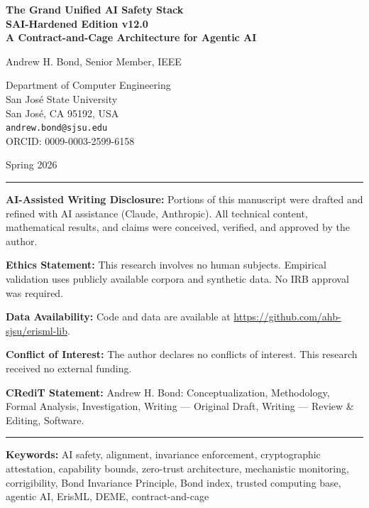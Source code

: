 \documentclass[11pt,letterpaper]{article}
\theoremstyle{definition}
\theoremstyle{remark}
\begin{document}
\begin{titlepage}
\centering
\vspace*{2cm}

{\LARGE\bfseries The Grand Unified AI Safety Stack\\
\Large SAI-Hardened Edition v12.0\\[0.5em]
\large A Contract-and-Cage Architecture for Agentic AI}

\vspace{1.5cm}

{\Large Andrew H. Bond, Senior Member, IEEE}

\vspace{0.5cm}

{\large
Department of Computer Engineering\\
San Jos\'e State University\\
San Jos\'e, CA 95192, USA\\[0.3cm]
\texttt{andrew.bond@sjsu.edu}\\[0.3cm]
ORCID: 0009-0003-2599-6158
}

\vspace{1cm}

{\large Spring 2026}

\vfill

\noindent\rule{\linewidth}{0.4pt}
\small
\noindent\textbf{AI-Assisted Writing Disclosure:} Portions of this manuscript were drafted and refined with AI assistance (Claude, Anthropic). All technical content, mathematical results, and claims were conceived, verified, and approved by the author.

\noindent\textbf{Ethics Statement:} This research involves no human subjects. Empirical validation uses publicly available corpora and synthetic data. No IRB approval was required.

\noindent\textbf{Data Availability:} Code and data are available at \url{https://github.com/ahb-sjsu/erisml-lib}.

\noindent\textbf{Conflict of Interest:} The author declares no conflicts of interest. This research received no external funding.

\noindent\textbf{CRediT Statement:} Andrew H. Bond: Conceptualization, Methodology, Formal Analysis, Investigation, Writing --- Original Draft, Writing --- Review \& Editing, Software.
\noindent\rule{\linewidth}{0.4pt}
\normalsize

\end{titlepage}

\noindent\textbf{Keywords:} AI safety, alignment, invariance enforcement, cryptographic attestation, capability bounds, zero-trust architecture, mechanistic monitoring, corrigibility, Bond Invariance Principle, Bond index, trusted computing base, agentic AI, ErisML, DEME, contract-and-cage
\end{document}
